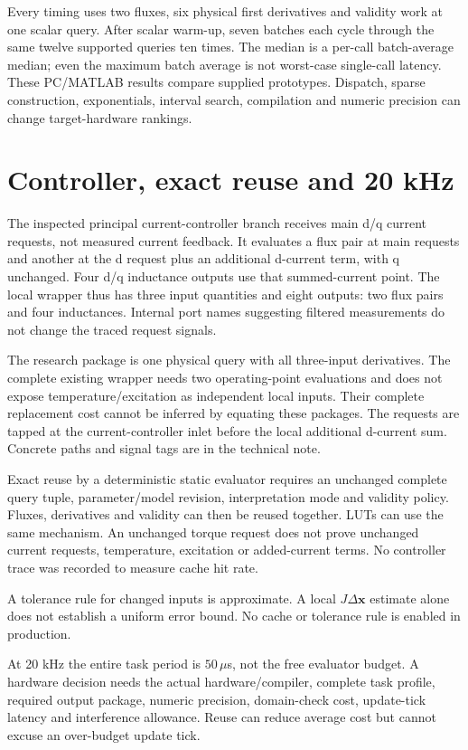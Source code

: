 \documentclass[11pt,a4paper]{article}
\begin{document}
Every timing uses two fluxes, six physical first derivatives and validity work at one scalar query. After scalar warm-up, seven batches each cycle through the same twelve supported queries ten times. The median is a per-call batch-average median; even the maximum batch average is not worst-case single-call latency.
{\small\CostTable}
These PC/MATLAB results compare supplied prototypes. Dispatch, sparse construction, exponentials, interval search, compilation and numeric precision can change target-hardware rankings.

\section{Controller, exact reuse and 20 kHz}
The inspected principal current-controller branch receives main d/q current requests, not measured current feedback. It evaluates a flux pair at main requests and another at the d request plus an additional d-current term, with q unchanged. Four d/q inductance outputs use that summed-current point. The local wrapper thus has three input quantities and eight outputs: two flux pairs and four inductances. Internal port names suggesting filtered measurements do not change the traced request signals.

The research package is one physical query with all three-input derivatives. The complete existing wrapper needs two operating-point evaluations and does not expose temperature/excitation as independent local inputs. Their complete replacement cost cannot be inferred by equating these packages. The requests are tapped at the current-controller inlet before the local additional d-current sum. Concrete paths and signal tags are in the technical note.

Exact reuse by a deterministic static evaluator requires an unchanged complete query tuple, parameter/model revision, interpretation mode and validity policy. Fluxes, derivatives and validity can then be reused together. LUTs can use the same mechanism. An unchanged torque request does not prove unchanged current requests, temperature, excitation or added-current terms. No controller trace was recorded to measure cache hit rate.

A tolerance rule for changed inputs is approximate. A local $J\Delta\bm x$ estimate alone does not establish a uniform error bound. No cache or tolerance rule is enabled in production.

At 20 kHz the entire task period is $50\,\mu$s, not the free evaluator budget. A hardware decision needs the actual hardware/compiler, complete task profile, required output package, numeric precision, domain-check cost, update-tick latency and interference allowance. Reuse can reduce average cost but cannot excuse an over-budget update tick.
\end{document}
